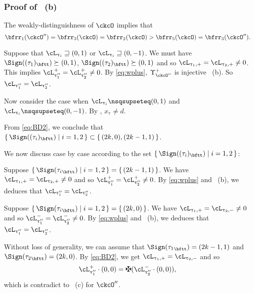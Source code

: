 \documentclass[12pt,a4paper]{amsart}
\numberwithin{equation}{section}
\theoremstyle{remark}
\def\uptaupp{\uptau^{\prime\prime}}
\begin{document}
\subsubsection*{Proof of ~(b)}
\def\tauot{(\tau_1)_{\bftt}}
\def\tautt{(\tau_2)_{\bftt}}
The weakly-distinguishness of $\ckcO$ implies that  
\begin{equation}\label{eq:wplus}
  \bfrr_{1}(\ckcO'') = \bfrr_{3}(\ckcO)=\bfrr_{2}(\ckcO)>\bfrr_{5}(\ckcO) = \bfrr_{3}(\ckcO'').
\end{equation}

Suppose that  $\ac_{\uptau_{i}} \sqsupseteq (0,1)$ or $\ac_{\uptau_{i}} \sqsupseteq (0,-1)$.
We must have $\Sign(\tauot)\succeq (0,1)$, $\Sign(\tautt)\succeq (0,1)$ and so
$\ppac{\uptau_1} = \ppac{\uptau_2}\neq 0$.  
This implies $\pac{\uptaupp_{1}}=\pac{\uptaupp_{2}}\neq 0$. By \eqref{eq:wplus},
$\Upsilon^+_{\ckcO''}$ is injective ~(b). So  $\ac_{\uptaupp_{1}}
= \ac_{\uptaupp_{2}}$.  

\smallskip

Now consider the case when $\ac_{\uptau_{i}}\nsqsupseteq (0,1)$ and
$\ac_{\uptau_{i}}\nsqsupseteq (0,-1)$. By , $x_{\uptau}\neq d$.

From \eqref{eq:BD2}, we conclude that $\set{\Sign((\tau_{i})_{\bftt})|i=1,2}
\subset\set{ (2k,0),(2k-1,1)}$.

We now discuss case by case according to the set $\set{\Sign((\tau_{i})_{\bftt})|i=1,2}$:
  \begin{enumPF}
    \item Suppose
    $\set{\Sign({\tau_{i}}_{\bftt})|i=1,2} = \set{(2k-1,1)}$. We have 
    $\ppac{\uptau_1} = \ppac{\uptau_2}\neq 0$ and so 
    $\pac{\uptaupp_{1}}=\pac{\uptaupp_{2}}\neq 0$.
    By \eqref{eq:wplus} and ~(b), we deduces
    that $\ac_{\uptaupp_{1}}=\ac_{\uptaupp_{2}}$.
    \item
    Suppose $\set{\Sign({\tau_{i}}_{\bftt})|i=1,2} = \set{(2k,0)}$. We have
   $\ppac{\uptau_1}=\nnac{\uptau_2}\neq 0$ and so
   $\nac{\uptaupp_{1}}=\nac{\uptaupp_{2}}\neq 0$. By \eqref{eq:wplus} and
   ~(b), we deduces that $\ac_{\uptaupp_{1}}=\ac_{\uptaupp_{2}}$.
    \item 
    Without loss of generality, we can assume that $\Sign({\tau_{1}}_{\bftt}) =
    (2k-1,1)$ and $\Sign({\tau_{2}}_{\bftt}) = (2k,0)$. By \eqref{eq:BD2}, we
    get $\ppac{\uptau_1} = \nnac{\uptau_2}$ and so 
    \[
      \pac{\uptaupp_{1}}\cdot (0,0)=\maltese(\nac{\uptaupp_{2}}\cdot (0,0)),
    \]
    which is contradict to ~(c) for $\ckcO''$.
  \end{enumPF}
\end{document}
